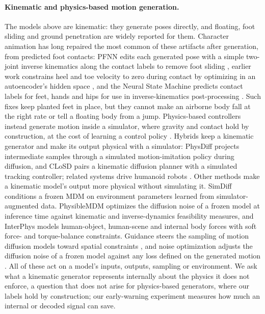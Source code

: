 \paragraph{Kinematic and physics-based motion generation.}
The models above are kinematic: they generate poses directly, and floating, foot sliding and ground penetration are widely reported for them. Character animation has long repaired the most common of these artifacts after generation, from predicted foot contacts: PFNN edits each generated pose with a simple two-joint inverse kinematics along the contact labels to remove foot sliding \citep{holden2017pfnn}, earlier work constrains heel and toe velocity to zero during contact by optimizing in an autoencoder's hidden space \citep{holden2016deep}, and the Neural State Machine predicts contact labels for feet, hands and hips for use in inverse-kinematics post-processing \citep{starke2019nsm}. Such fixes keep planted feet in place, but they cannot make an airborne body fall at the right rate or tell a floating body from a jump. Physics-based controllers instead generate motion inside a simulator, where gravity and contact hold by construction, at the cost of learning a control policy \citep{peng2018deepmimic,tessler2024maskedmimic}. Hybrids keep a kinematic generator and make its output physical with a simulator: PhysDiff \citep{yuan2023physdiff} projects intermediate samples through a simulated motion-imitation policy during diffusion, and CLoSD \citep{tevet2024closd} pairs a kinematic diffusion planner with a simulated tracking controller; related systems drive humanoid robots \citep{wang2026motionbricks}. Other methods make a kinematic model's output more physical without simulating it. SimDiff \citep{simdiff2025} conditions a frozen MDM on environment parameters learned from simulator-augmented data. PhysibleMDM \citep{physiblemdm2026} optimizes the diffusion noise of a frozen model at inference time against kinematic and inverse-dynamics feasibility measures, and InterPhys \citep{xing2026interphys} models human-object, human-scene and internal body forces with soft force- and torque-balance constraints. Guidance steers the sampling of motion diffusion models toward spatial constraints \citep{karunratanakul2023gmd,xie2024omnicontrol}, and noise optimization adjusts the diffusion noise of a frozen model against any loss defined on the generated motion \citep{karunratanakul2024dno}. All of these act on a model's inputs, outputs, sampling or environment. We ask what a kinematic generator represents internally about the physics it does not enforce, a question that does not arise for physics-based generators, where our labels hold by construction; our early-warning experiment measures how much an internal or decoded signal can save.

